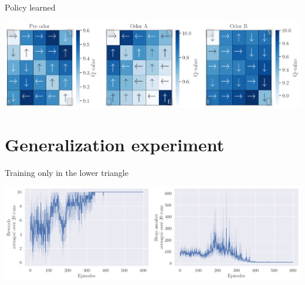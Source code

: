 \documentclass[bigger]{beamer}
\begin{document}
\begin{frame}[label={sec:org86f830c}]{Policy learned}
\begin{center}
\includegraphics[width=\linewidth]{img/policy.png}
\end{center}
\end{frame}
\section{Generalization experiment}
\label{sec:orgb295475}
\begin{frame}[label={sec:org0527c26}]{Training only in the lower triangle}
\begin{center}
\includegraphics[width=\linewidth]{img/steps-and-rewards-lower-only.png}
\end{center}
\end{frame}
\end{document}

